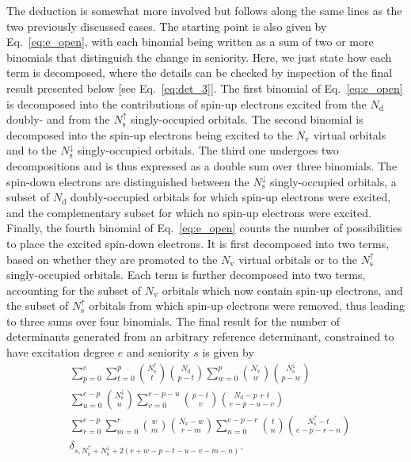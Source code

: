 \documentclass[aip,jcp,reprint,noshowkeys,superscriptaddress]{revtex4-1}
\newcommand{\Nd}{N_\text{d}}
\newcommand{\Nv}{N_\text{v}}
\newcommand{\Nas}{N_\text{s}^{\uparrow}}
\newcommand{\Nbs}{N_\text{s}^{\downarrow}}
\begin{document}
The deduction is somewhat more involved but follows along the same lines as the two previously discussed cases.
The starting point is also given by Eq.~\eqref{eq:e_open}, with each binomial being written as a sum of two or more binomials that distinguish the change in seniority.
Here, we just state how each term is decomposed, where the details can be checked by inspection of the final result presented below [see Eq.~\eqref{eq:det_3}].
The first binomial of Eq.~\eqref{eq:e_open} is decomposed into the contributions of spin-up electrons excited from the $\Nd$ doubly- and from the $\Nas$ singly-occupied orbitals.
The second binomial is decomposed into the spin-up electrons being excited to the $\Nv$ virtual orbitals and to the $\Nbs$ singly-occupied orbitals.
The third one undergoes two decompositions and is thus expressed as a double sum over three binomials.
The spin-down electrons are distinguished between the $\Nbs$ singly-occupied orbitals, a subset of $\Nd$ doubly-occupied orbitals for which spin-up electrons were excited,
and the complementary subset for which no spin-up electrons were excited.
Finally, the fourth binomial of Eq.~\eqref{eq:e_open} counts the number of possibilities to place the excited spin-down electrons.
It is first decomposed into two terms, based on whether they are promoted to the $\Nv$ virtual orbitals or to the $\Nas$ singly-occupied orbitals.
Each term is further decomposed into two terms, accounting for the subset of $\Nv$ orbitals which now contain spin-up electrons,
and the subset of $\Nas$ orbitals from which spin-up electrons were removed,
thus leading to three sums over four binomials.
The final result for the number of determinants generated from an arbitrary reference determinant, constrained to have excitation degree $e$ and seniority $s$ is given by
\begin{equation}
\begin{split}
	& \sum_{p=0}^{e} 
	\sum_{t=0}^{p} \binom{\Nas}{t} \binom{\Nd}{p-t} 
	\sum_{w=0}^{p} \binom{\Nv}{w} \binom{\Nbs}{p-w} \\
	& \sum_{u=0}^{e-p} \binom{\Nbs}{u} 
	\sum_{v=0}^{e-p-u} \binom{p-t}{v} \binom{\Nd-p+t}{e-p-u-v} \\
	& \sum_{r=0}^{e-p} \sum_{m=0}^{r} \binom{w}{m} \binom{\Nv-w}{r-m} 
	\sum_{n=0}^{e-p-r} \binom{t}{n} \binom{\Nas-t}{e-p-r-n} \\
	& \delta_{s,\Nas+\Nbs+2(e+w-p-t-u-v-m-n)}.
\label{eq:det_3}
\end{split}
\end{equation}



\end{document}
